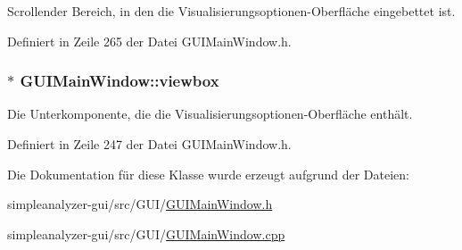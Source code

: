 Scrollender Bereich, in den die Visualisierungsoptionen-\/\-Oberfläche eingebettet ist. 



Definiert in Zeile 265 der Datei G\-U\-I\-Main\-Window.\-h.

\hypertarget{classGUIMainWindow_a3e9a4e301f90e85e97721aa71b197ca8}{
\subsubsection[{viewbox}]{$\ast$ G\-U\-I\-Main\-Window\-::viewbox\hspace{0.3cm}{\ttfamily [private]}}}\label{classGUIMainWindow_a3e9a4e301f90e85e97721aa71b197ca8}


Die Unterkomponente, die die Visualisierungsoptionen-\/\-Oberfläche enthält. 



Definiert in Zeile 247 der Datei G\-U\-I\-Main\-Window.\-h.



Die Dokumentation für diese Klasse wurde erzeugt aufgrund der Dateien\-:\begin{DoxyCompactItemize}
\item 
simpleanalyzer-\/gui/src/\-G\-U\-I/\hyperlink{GUIMainWindow_8h}{G\-U\-I\-Main\-Window.\-h}\item 
simpleanalyzer-\/gui/src/\-G\-U\-I/\hyperlink{GUIMainWindow_8cpp}{G\-U\-I\-Main\-Window.\-cpp}\end{DoxyCompactItemize}
